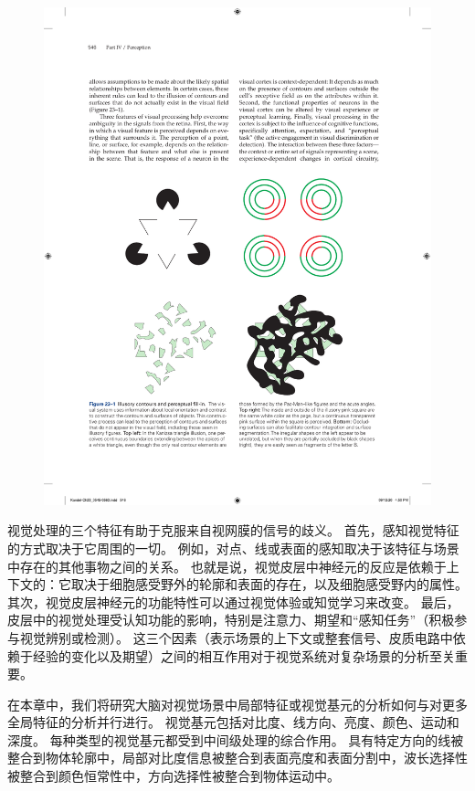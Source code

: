 \begin{figure}[htbp]
	\centering
	\includegraphics[width=1.0\linewidth]{chap23/fig_23_1}
	\caption{}
	\label{fig:23_1}
\end{figure}


视觉处理的三个特征有助于克服来自视网膜的信号的歧义。 首先，感知视觉特征的方式取决于它周围的一切。 例如，对点、线或表面的感知取决于该特征与场景中存在的其他事物之间的关系。 也就是说，视觉皮层中神经元的反应是依赖于上下文的：它取决于细胞感受野外的轮廓和表面的存在，以及细胞感受野内的属性。 其次，视觉皮层神经元的功能特性可以通过视觉体验或知觉学习来改变。 最后，皮层中的视觉处理受认知功能的影响，特别是注意力、期望和“感知任务”（积极参与视觉辨别或检测）。 这三个因素（表示场景的上下文或整套信号、皮质电路中依赖于经验的变化以及期望）之间的相互作用对于视觉系统对复杂场景的分析至关重要。

在本章中，我们将研究大脑对视觉场景中局部特征或视觉基元的分析如何与对更多全局特征的分析并行进行。 视觉基元包括对比度、线方向、亮度、颜色、运动和深度。 每种类型的视觉基元都受到中间级处理的综合作用。 具有特定方向的线被整合到物体轮廓中，局部对比度信息被整合到表面亮度和表面分割中，波长选择性被整合到颜色恒常性中，方向选择性被整合到物体运动中。

